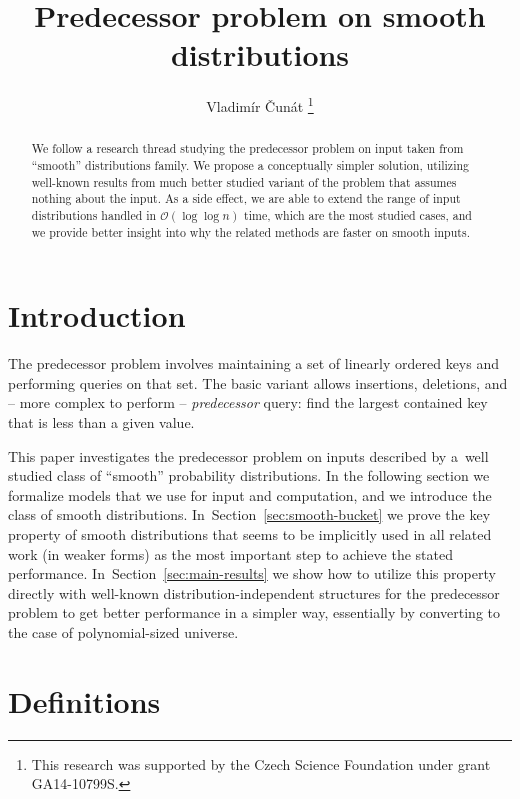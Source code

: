 \documentclass[
submission
]{dmtcs-episciences}
\title{Predecessor problem on smooth distributions}
\affiliation{
  Faculty of Mathematics and Physics, Charles University in Prague, Czech Republic \\
  CZ.NIC, z.\,s.\,p.\,o.
}
\author{Vladim\'ir \v{C}un\'at\affiliationmark{1,2}%
  \thanks{This research was supported by the Czech Science Foundation under grant GA14-10799S.}
}
\theoremstyle{plain}
\theoremstyle{definition}
\theoremstyle{remark}
\theoremstyle{plain}
\theoremstyle{plain}
\def\OO{\mathcal O}
\begin{document}
\maketitle

\begin{abstract}
We follow a research thread studying the predecessor problem on input
taken from ``smooth'' distributions family. We propose a conceptually
simpler solution, utilizing well-known results from much better studied
variant of the problem that assumes nothing about the input. As a
side effect, we are able to extend the range of input distributions
handled in $\OO\left(\log\log n\right)$ time, which are the most
studied cases, and we provide better insight into why the related
methods are faster on smooth inputs.
\end{abstract}




\section{Introduction}

The predecessor problem involves maintaining a set of linearly
ordered keys and performing queries on that set. The basic variant allows insertions, deletions, and -- more complex to perform -- \emph{predecessor} query: find the largest contained key that is less than a given value. 

This paper investigates the predecessor problem on inputs described by  a~well studied class of ``smooth'' probability distributions.
In the following section we formalize models that we use for input and computation,
and we introduce the class of smooth distributions. In~Section~\ref{sec:smooth-bucket} we
prove the key property of smooth distributions that seems to be
implicitly used in all related work (in weaker forms) as the most
important step to achieve the stated performance. In~Section~\ref{sec:main-results}
we show how to utilize this property directly with well-known distribution-independent
structures for the predecessor problem to get better performance in
a simpler way, essentially by converting to the case of polynomial-sized
universe.

\section{Definitions \label{sec:defs}}
\end{document}
